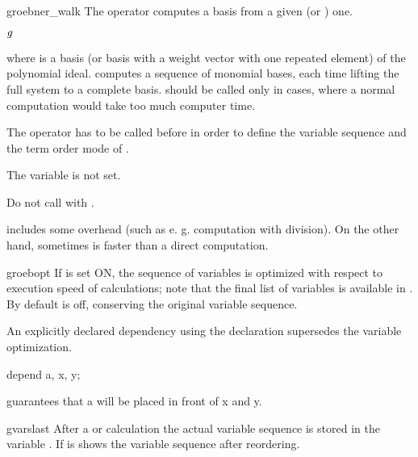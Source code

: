 \begin{Operator}{groebner\_walk}
The operator  computes a  basis
from a given  (or ) one.
\begin{Syntax}
   \(\meta{g}\)
\end{Syntax}

where  is a  basis (or  basis
with a weight vector with one repeated element) of the polynomial ideal. 
 computes a sequence of monomial bases, each
time lifting the full system to a complete basis.  
should be called only in cases, where a normal  computation
would take too much computer time.

The operator  has to be called before in order to
define the variable sequence and the term order mode of . 

The variable  is not set.

Do not call  with  .

 includes some overhead (such as e. g. 
computation with division). On the other hand, sometimes
 is faster than a direct  computation.
\end{Operator}


\begin{Switch}{groebopt}
If  is set ON, the sequence of variables is optimized
with respect to execution speed of  calculations; 
note that the final list of variables is available in .
By default  is off, conserving the original variable
sequence.

An explicitly declared dependency using the 
declaration  supersedes the variable optimization.
\begin{Examples}

   depend a, x, y;

\end{Examples}
guarantees that a will be placed in front of x and y.
\end{Switch}



\begin{Variable}{gvarslast}
After a  or  calculation
the actual variable sequence is stored in the variable 
. If  is 
 shows the variable sequence after reordering.
\end{Variable}

